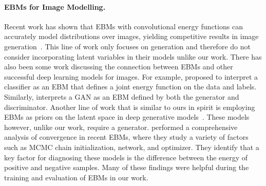 \documentclass{article}
\begin{document}



\paragraph{EBMs for Image Modelling.} Recent work has shown that EBMs with convolutional energy functions can accurately model distributions over images, yielding competitive results in image generation~\citep{xie2016theory,nijkamp2019anatomy,nijkamp2019learning, du2019implicit}. This line of work only focuses on generation and therefore do not consider incorporating latent variables in their models unlike our work. There has also been some work discussing the connection between EBMs and other successful deep learning models for images. For example, \citet{grathwohl2019your,liu2020hybrid} proposed to interpret a classifier as an EBM that defines a joint energy function on the data and labels. Similarly, \citet{che_your_2020} interprets a GAN as an EBM defined by both the generator and discriminator. Another line of work that is similar to ours in spirit is employing EBMs as priors on the latent space in deep generative models~\citep{pang2020learning,aneja2020ncp}. These models however, unlike our work, require a generator. \citet{nijkamp2019anatomy,nijkamp2019learning} performed a comprehensive analysis of convergence in recent EBMs, where they study a variety of factors such as MCMC chain initialization, network, and optimizer. They identify that a key factor for diagnosing these models is the difference between the energy of positive and negative samples. Many of these findings were helpful during the training and evaluation of EBMs in our work. 
\end{document}

